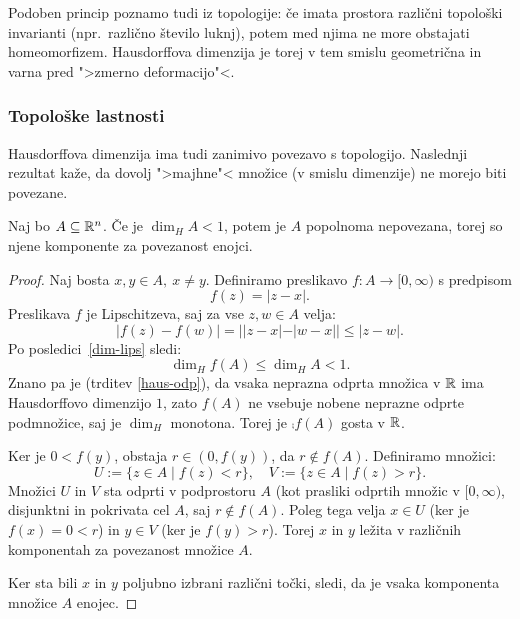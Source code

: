 \begin{opomba}
    Podoben princip poznamo tudi iz topologije: če imata prostora različni topološki invarianti (npr.\ različno število luknj), potem med njima ne more obstajati homeomorfizem. Hausdorffova dimenzija je torej v tem smislu geometrična in varna pred ">zmerno deformacijo"<.
\end{opomba}

\subsubsection{Topološke lastnosti}
Hausdorffova dimenzija ima tudi zanimivo povezavo s topologijo. Naslednji rezultat kaže, da dovolj ">majhne"< množice (v smislu dimenzije) ne morejo biti povezane.

\begin{trditev}
    \label{povezanost}
    Naj bo \(A \subseteq \mathbb{R}^n\). Če je \(\dim_H A < 1\), potem je \(A\) popolnoma nepovezana, torej so njene komponente za povezanost enojci.
\end{trditev}

\begin{proof}
    Naj bosta \(x, y \in A, \ x \neq y\). Definiramo preslikavo \(f: A \to [0, \infty)\) s predpisom
    \[f(z) = |z-x|.\]
    Preslikava \(f\) je Lipschitzeva, saj za vse \(z, w \in A\) velja:
    \[
        |f(z) - f(w)| = ||z - x| - |w - x|| \leq |z - w|.
    \]
    Po posledici~\ref{dim-lips} sledi:
    \[
        \dim_H f(A) \leq \dim_H A < 1.
    \]
    Znano pa je (trditev \ref{haus-odp}), da vsaka neprazna odprta množica v \(\mathbb{R}\) ima Hausdorffovo dimenzijo \(1\), zato \(f(A)\) ne vsebuje nobene neprazne odprte podmnožice, saj je \(\dim_H\) monotona. Torej je \(\comp{f(A)}\) gosta v \(\mathbb{R}\).

    Ker je \(0 < f(y)\), obstaja \(r \in (0, f(y))\), da \(r \notin f(A)\). Definiramo množici:
    \[
        U := \{ z \in A \mid f(z) < r \}, \quad V := \{ z \in A \mid f(z) > r \}.
    \]
    Množici \(U\) in \(V\) sta odprti v podprostoru \(A\) (kot prasliki odprtih množic v \([0, \infty)\), disjunktni in pokrivata cel \(A\), saj \(r \notin f(A)\). Poleg tega velja \(x \in U\) (ker je \(f(x) = 0 < r\)) in \(y \in V\) (ker je \(f(y) > r\)). Torej \(x\) in \(y\) ležita v različnih komponentah za povezanost množice \(A\).

    Ker sta bili \(x\) in \(y\) poljubno izbrani različni točki, sledi, da je vsaka komponenta množice \(A\) enojec.
\end{proof}


